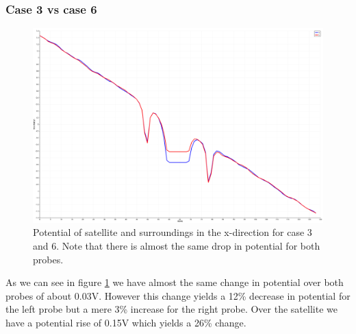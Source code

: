 \subsubsection{Case 3 vs case 6}

\begin{figure}
    \centering
    \includegraphics[width = 0.6 \textwidth]{images/pot_case36_new.png}
    \caption{Potential of satellite and surroundings in the x-direction for case 3 and 6. Note that there is almost the same drop in potential for both probes.}
    \label{fig:pot_case36}
\end{figure}

As we can see in figure \ref{fig:pot_case36} we have almost the same change in potential over both probes of about 0.03V. However this change yields a 12\% decrease in potential for the left probe but a mere 3\% increase for the right probe. Over the satellite we have a potential rise of 0.15V which yields a 26\% change.
